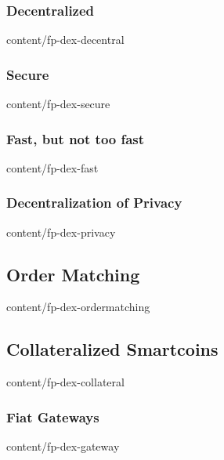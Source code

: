 \documentclass{btswhitepaper}
\begin{document}
\subsubsection  { Decentralized                                    }  { content/fp-dex-decentral       } 
\subsubsection  { Secure                                           }  { content/fp-dex-secure          } 
\subsubsection  { Fast, but not too fast                           }  { content/fp-dex-fast            } 
\subsubsection  { Decentralization of Privacy                      }  { content/fp-dex-privacy         } 
\subsection     { Order Matching                                   }  { content/fp-dex-ordermatching   } 
\subsection     { Collateralized Smartcoins                        }  { content/fp-dex-collateral      } 
\subsubsection  { Fiat Gateways                                    }  { content/fp-dex-gateway         } 
\end{document}
